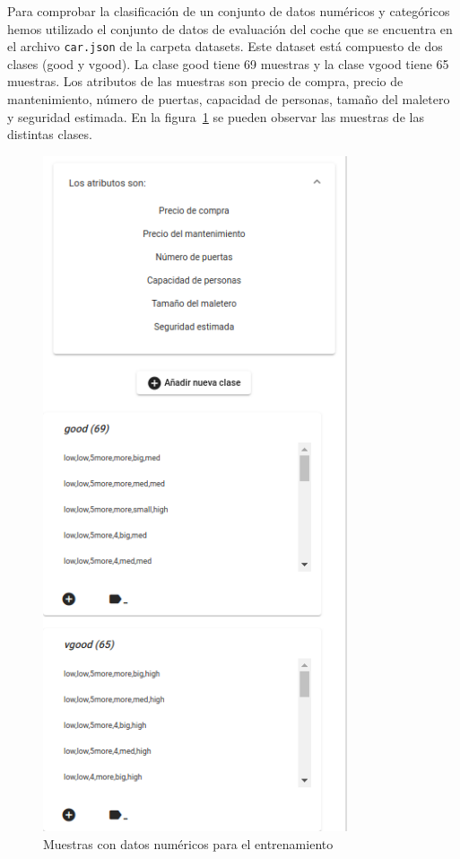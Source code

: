 \documentclass[a4paper, 12pt]{book}
\begin{document}
Para comprobar la clasificación de un conjunto de datos numéricos y categóricos hemos utilizado el conjunto de datos de evaluación del coche que se encuentra en el archivo \texttt{car.json} de la carpeta datasets. Este dataset está compuesto de dos clases (good y vgood). La clase good tiene 69 muestras y la clase vgood tiene 65 muestras.
Los atributos de las muestras son precio de compra, precio de mantenimiento, número de puertas, capacidad de personas, tamaño del maletero y seguridad estimada. 
En la figura~\ref{fig:ejemplo17} se pueden observar las muestras de las distintas clases.

\begin{figure}
	\centering
	\includegraphics[width=9cm, keepaspectratio]{img/ejemplo_muestras_numycat.png}
	\caption{Muestras con datos numéricos para el entrenamiento} 	\label{fig:ejemplo17}
\end{figure}
\end{document}
